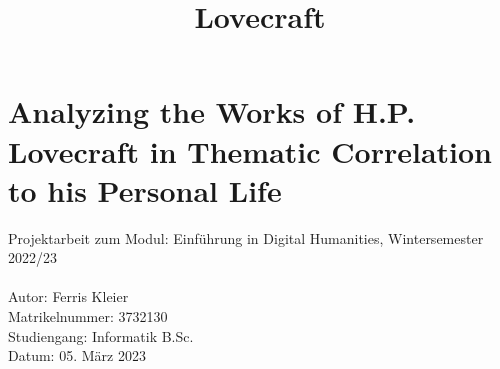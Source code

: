 \documentclass[11pt]{article}
\title{Lovecraft}
\begin{document}
     \section*{Analyzing the Works of H.P. Lovecraft in Thematic Correlation to his Personal Life}
    Projektarbeit zum Modul: Einführung in Digital Humanities, Wintersemester 2022/23\\\\
    Autor: Ferris Kleier\\
    Matrikelnummer: 3732130\\
    Studiengang: Informatik B.Sc.\\
    Datum: 05. März 2023

    
    
    
    
    
    
    
    
    
\end{document}
